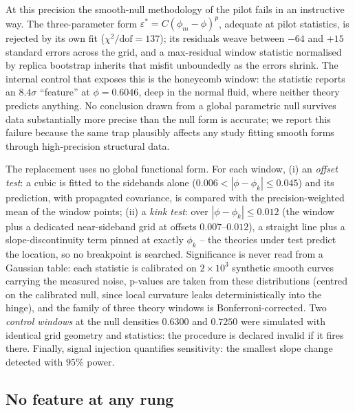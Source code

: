 \documentclass[11pt]{article}
\begin{document}
At this precision the smooth-null methodology of the pilot fails in an
instructive way. The three-parameter form
$\varepsilon^*=C(\phi_m-\phi)^p$, adequate at pilot statistics, is rejected
by its own fit ($\chi^2/\mathrm{dof}=137$); its residuals weave between
$-64$ and $+15$ standard errors across the grid, and a max-residual window
statistic normalised by replica bootstrap inherits that misfit unboundedly
as the errors shrink. The internal control that exposes this is the
honeycomb window: the statistic reports an $8.4\sigma$ ``feature'' at
$\phi=0.6046$, deep in the normal fluid, where neither theory predicts
anything. No conclusion drawn from a global parametric null survives data
substantially more precise than the null form is accurate; we report this
failure because the same trap plausibly affects any study fitting smooth
forms through high-precision structural data.

The replacement uses no global functional form. For each window, (i) an
\emph{offset test}: a cubic is fitted to the sidebands alone
($0.006<|\phi-\phi_k|\leq0.045$) and its prediction, with propagated
covariance, is compared with the precision-weighted mean of the window
points; (ii) a \emph{kink test}: over $|\phi-\phi_k|\leq0.012$ (the window
plus a dedicated near-sideband grid at offsets $0.007$--$0.012$), a straight
line plus a slope-discontinuity term pinned at exactly $\phi_k$ -- the
theories under test predict the location, so no breakpoint is searched.
Significance is never read from a Gaussian table: each statistic is
calibrated on $2\times10^3$ synthetic smooth curves carrying the measured
noise, p-values are taken from these distributions (centred on the
calibrated null, since local curvature leaks deterministically into the
hinge), and the family of three theory windows is Bonferroni-corrected.
Two \emph{control windows} at the null densities $0.6300$ and $0.7250$ were
simulated with identical grid geometry and statistics: the procedure is
declared invalid if it fires there. Finally, signal injection quantifies
sensitivity: the smallest slope change detected with $95\%$ power.

\subsection{No feature at any rung}
\end{document}
